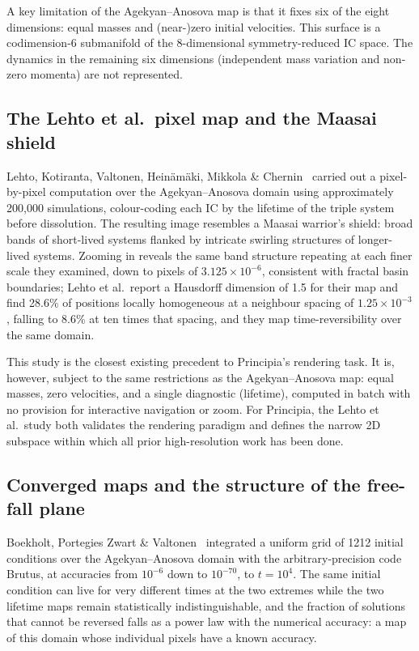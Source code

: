\documentclass[11pt,a4paper]{article}
\begin{document}
A key limitation of the Agekyan--Anosova map is that it fixes six of the eight dimensions: equal
masses and (near-)zero initial velocities.  This surface is a codimension-6 submanifold of the
8-dimensional symmetry-reduced IC space.  The dynamics in the remaining six dimensions
(independent mass variation and non-zero momenta) are not represented.

\subsection{The Lehto et al.\ pixel map and the Maasai shield}

Lehto, Kotiranta, Valtonen, Heinäm\"{a}ki, Mikkola \& Chernin~\cite{lehto2008} carried out a
pixel-by-pixel computation over the Agekyan--Anosova domain using approximately 200,000
simulations, colour-coding each IC by the lifetime of the triple system before dissolution.  The
resulting image resembles a Maasai warrior's shield: broad bands of short-lived systems flanked
by intricate swirling structures of longer-lived systems.  Zooming in reveals the same band
structure repeating at each finer scale they examined, down to pixels of $3.125\times10^{-6}$,
consistent with fractal basin boundaries; Lehto et al.\ report
a Hausdorff dimension of 1.5 for their map and find 28.6\% of positions locally
homogeneous at a neighbour spacing of $1.25\times10^{-3}$, falling to 8.6\% at ten times that
spacing, and they map time-reversibility over the same domain.

This study is the closest existing precedent to Principia's rendering task.  It is, however,
subject to the same restrictions as the Agekyan--Anosova map: equal masses, zero velocities, and
a single diagnostic (lifetime), computed in batch with no provision for interactive navigation or
zoom.  For Principia, the Lehto et al.\ study both validates the rendering paradigm and defines
the narrow 2D subspace within which all prior high-resolution work has been done.

\subsection{Converged maps and the structure of the free-fall plane}

Boekholt, Portegies Zwart \& Valtonen~\cite{boekholt2020} integrated a uniform grid of 1212
initial conditions over the Agekyan--Anosova domain with the arbitrary-precision code Brutus, at
accuracies from $10^{-6}$ down to $10^{-70}$, to $t = 10^4$.  The same initial condition can live
for very different times at the two extremes while the two lifetime maps remain statistically
indistinguishable, and the fraction of solutions that cannot be reversed falls as a power law
with the numerical accuracy: a map of this domain whose individual pixels have a known accuracy.
\end{document}
